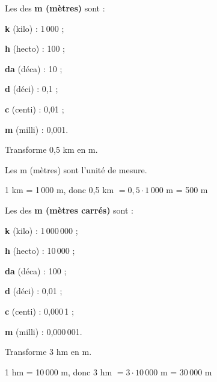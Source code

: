 
\begin{methode*1}

\begin{aconnaitre}
Les  des \textbf{\textcolor{H1}{m (mètres)}} sont :
\begin{colitemize}{2}
\item \textbf{k} (kilo) : 1\,000 ;
\item \textbf{h} (hecto) : 100 ;
\item \textbf{da} (déca) : 10 ;
\item \textbf{d} (déci) : 0,1 ;
\item \textbf{c} (centi) : 0,01 ;
\item \textbf{m} (milli) : 0,001.
\end{colitemize}
\end{aconnaitre}


\begin{exemple*1}
Transforme 0,5 km en m.

Les m (mètres) sont l'unité de mesure.

1 km = 1\,000 m, donc 0,5 km $= 0,5 \cdot 1\,000$ m = 500 m
\end{exemple*1}


\begin{aconnaitre}
Les  des \textbf{\textcolor{H1}{m (mètres carrés)}} sont :
\begin{colitemize}{2}
\item \textbf{k} (kilo) : 1\,000\,000 ;
\item \textbf{h} (hecto) : 10\,000 ;
\item \textbf{da} (déca) : 100 ;
\item \textbf{d} (déci) : 0,01 ;
\item \textbf{c} (centi) : 0,000\,1 ;
\item \textbf{m} (milli) : 0,000\,001.
\end{colitemize}
\end{aconnaitre}


\begin{exemple*1}
Transforme 3 hm en m.

1 hm = 10\,000 m, donc 3 hm $= 3 \cdot 10\,000$ m = 30\,000 m
\end{exemple*1}



\end{methode*1}
